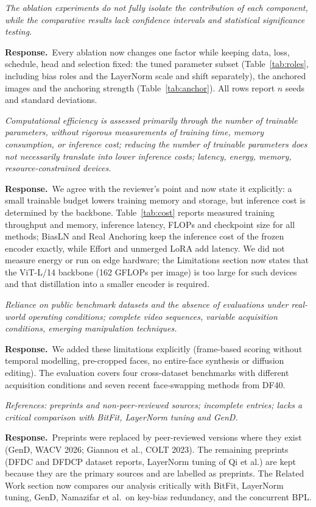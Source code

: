 \documentclass[11pt]{article}
\newenvironment{comment}{\par\medskip\noindent\begin{minipage}{\linewidth}\color{black!70}\itshape}{\end{minipage}\par\smallskip}
\newcommand{\resp}{\noindent\textbf{Response.}~}
\begin{document}
\begin{comment}
The ablation experiments do not fully isolate the contribution of each component, while the comparative results lack confidence intervals and statistical significance testing.
\end{comment}
\resp Every ablation now changes one factor while keeping data, loss, schedule, head and selection fixed: the tuned parameter subset (Table~\ref{tab:roles}, including bias roles and the LayerNorm scale and shift separately), the anchored images and the anchoring strength (Table~\ref{tab:anchor}). All rows report $n$ seeds and standard deviations.

\begin{comment}
Computational efficiency is assessed primarily through the number of trainable parameters, without rigorous measurements of training time, memory consumption, or inference cost; reducing the number of trainable parameters does not necessarily translate into lower inference costs; latency, energy, memory, resource-constrained devices.
\end{comment}
\resp We agree with the reviewer's point and now state it explicitly: a small trainable budget lowers training memory and storage, but inference cost is determined by the backbone. Table~\ref{tab:cost} reports measured training throughput and memory, inference latency, FLOPs and checkpoint size for all methods; BiasLN and Real Anchoring keep the inference cost of the frozen encoder exactly, while Effort and unmerged LoRA add latency. We did not measure energy or run on edge hardware; the Limitations section now states that the ViT-L/14 backbone (162 GFLOPs per image) is too large for such devices and that distillation into a smaller encoder is required.

\begin{comment}
Reliance on public benchmark datasets and the absence of evaluations under real-world operating conditions; complete video sequences, variable acquisition conditions, emerging manipulation techniques.
\end{comment}
\resp We added these limitations explicitly (frame-based scoring without temporal modelling, pre-cropped faces, no entire-face synthesis or diffusion editing). The evaluation covers four cross-dataset benchmarks with different acquisition conditions and seven recent face-swapping methods from DF40.

\begin{comment}
References: preprints and non-peer-reviewed sources; incomplete entries; lacks a critical comparison with BitFit, LayerNorm tuning and GenD.
\end{comment}
\resp Preprints were replaced by peer-reviewed versions where they exist (GenD, WACV 2026; Giannou et al., COLT 2023). The remaining preprints (DFDC and DFDCP dataset reports, LayerNorm tuning of Qi et al.) are kept because they are the primary sources and are labelled as preprints. The Related Work section now compares our analysis critically with BitFit, LayerNorm tuning, GenD, Namazifar et al.\ on key-bias redundancy, and the concurrent BPL.
\end{document}
